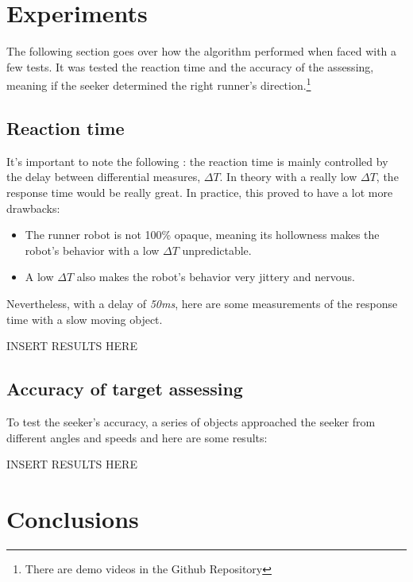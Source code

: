 \documentclass[sigconf,nonacm]{acmart}
\begin{document}
\section{Experiments}

The following section goes over how the algorithm performed when faced with a
few tests. It was tested the reaction time and the accuracy of the assessing,
meaning if the seeker determined the right runner's direction.\footnote[1]{There
are demo videos in the Github Repository}


\subsection{Reaction time}

It's important to note the following : the reaction time is mainly controlled by
the delay between differential measures, \textit{$ \Delta T$}. In theory with a really low $ \Delta T$, the
response time would be really great. In practice, this proved to have a lot more
drawbacks:
\begin{itemize}
      \item The runner robot is not 100\% opaque, meaning its hollowness makes
      the robot's behavior with a low  $ \Delta T$ unpredictable.

      \item A low $ \Delta T$ also makes the robot's behavior very jittery and nervous.
      
\end{itemize}

Nevertheless, with a delay of \textit{50ms}, here are some measurements of the
response time with a slow moving object.


\Large{
INSERT RESULTS HERE}



 
\subsection{Accuracy of target assessing}

To test the seeker's accuracy, a series of objects approached the seeker from
different angles and speeds and here are some results:


\Large{
INSERT RESULTS HERE}


\section{Conclusions}


% 
% 
\end{document}
